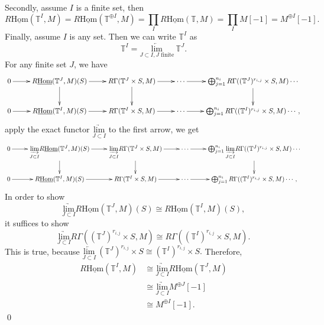\documentclass[UTF8,12,a4paper]{ctexart}
\theoremstyle{definition}
\begin{document}
Secondly, assume $I$ is a finite set, then
$$
R\underline{\text{Hom}}(\mathbb{T}^I,M)=R\underline{\text{Hom}}(\mathbb{T}^{\oplus I},M)=\prod_I R\underline{\text{Hom}}(\mathbb{T},M)=\prod_I M[-1]=M^{\oplus I}[-1].
$$
Finally, assume $I$ is any set. Then we can write $\mathbb{T}^I$ as $$\mathbb{T}^I=\underset{J\subset I, J \text{ finite}}{\underleftarrow{\text{lim}}}\  \mathbb{T}^J.$$
For any finite set $J$, we have
\begin{equation*}
\xymatrix
{
	0\ar[r]&R\underline{\text{Hom}}(\mathbb{T}^J,M)(S)\ar[d]\ar[r]& R\Gamma(\mathbb{T}^J\times S,M)\ar[d]\ar[r]&\cdots\ar[r]& \bigoplus_{j=1}^{n_i}R\Gamma((\mathbb{T}^J)^{r_{i,j}}\times S,M)\ar[d]\cdots\\
	0\ar[r]& R\underline{\text{Hom}}(\mathbb{T}^I,M)(S)\ar[r]& R\Gamma(\mathbb{T}^I\times S,M)\ar[r]&\cdots \ar[r]& \bigoplus_{j=1}^{n_i}R\Gamma((\mathbb{T}^I)^{r_{i,j}}\times S,M)\cdots,
}
\end{equation*}
apply the exact functor $\underset{J\subset I}{\underrightarrow{\text{lim}}}$ to the first arrow, we get
\begin{equation*}
\xymatrix
{
	0\ar[r]&\underset{J\subset I}{\underrightarrow{\text{lim}}} R\underline{\text{Hom}}(\mathbb{T}^J,M)(S)\ar[d]\ar[r]& \underset{J\subset I}{\underrightarrow{\text{lim}}} R\Gamma(\mathbb{T}^J\times S,M)\ar[d]\ar[r]&\cdots\ar[r]& \bigoplus_{j=1}^{n_i} \underset{J\subset I}{\underrightarrow{\text{lim}}} R\Gamma((\mathbb{T}^J)^{r_{i,j}}\times S,M)\ar[d]\cdots\\
	0\ar[r]& R\underline{\text{Hom}}(\mathbb{T}^I,M)(S)\ar[r]& R\Gamma(\mathbb{T}^I\times S,M)\ar[r]&\cdots \ar[r]& \bigoplus_{j=1}^{n_i}R\Gamma((\mathbb{T}^I)^{r_{i,j}}\times S,M)\cdots,
}
\end{equation*}
In order to show
$$
\underset{J\subset I}{\underrightarrow{\text{lim}}} R\underline{\text{Hom}}(\mathbb{T}^J,M)(S)\cong R\underline{\text{Hom}}(\mathbb{T}^I,M)(S),
$$ 
it suffices to show 
$$
\underset{J\subset I}{\underrightarrow{\text{lim}}} R\Gamma((\mathbb{T}^J)^{r_{i,j}}\times S,M)\cong R\Gamma((\mathbb{T}^I)^{r_{i,j}}\times S,M).
$$ 
This is true, because $\underset{J\subset I}{\underleftarrow{\text{lim}}}\ (\mathbb{T}^J)^{r_{i,j}}\times S\cong  (\mathbb{T}^I)^{r_{i,j}}\times S.$
Therefore, 
\begin{align*}
R\underline{\text{Hom}}(\mathbb{T}^I,M)
&\cong \underset{J\subset I}{\underrightarrow{\text{lim}}} R\underline{\text{Hom}}(\mathbb{T}^J,M)\\
&\cong \underset{J\subset I}{\underrightarrow{\text{lim}}} M^{\oplus J}[-1]\\
&\cong M^{\oplus I}[-1].
\end{align*}
\qed
\end{document}
